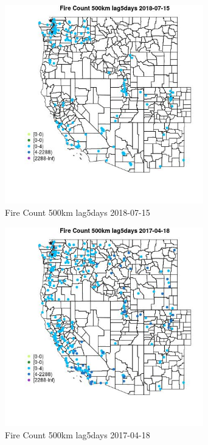 \begin{figure} 
\centering  
\includegraphics[width=0.77\textwidth]{Code_Outputs/Report_ML_input_PM25_Step4_part_e_de_duplicated_aves_compiled_2019-05-20wNAs_MapObsFire_Count_500km_lag5days2018-07-15.jpg} 
\caption{\label{fig:Report_ML_input_PM25_Step4_part_e_de_duplicated_aves_compiled_2019-05-20wNAsMapObsFire_Count_500km_lag5days2018-07-15}Fire Count 500km lag5days 2018-07-15} 
\end{figure} 
 

\clearpage 

\begin{figure} 
\centering  
\includegraphics[width=0.77\textwidth]{Code_Outputs/Report_ML_input_PM25_Step4_part_e_de_duplicated_aves_compiled_2019-05-20wNAs_MapObsFire_Count_500km_lag5days2017-04-18.jpg} 
\caption{\label{fig:Report_ML_input_PM25_Step4_part_e_de_duplicated_aves_compiled_2019-05-20wNAsMapObsFire_Count_500km_lag5days2017-04-18}Fire Count 500km lag5days 2017-04-18} 
\end{figure} 
 

